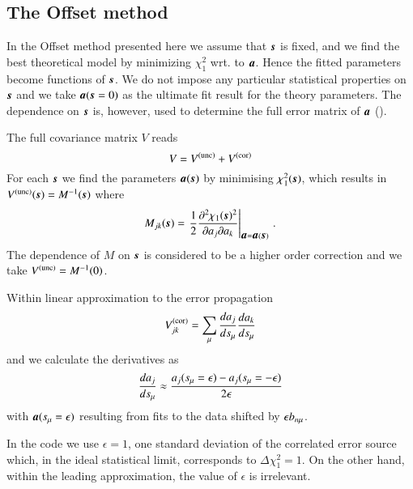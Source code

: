 \subsection{The Offset method}

In the Offset method presented here we assume that $\mb\rs$ is fixed, 
and we find the best theoretical model by minimizing
$\chi_1^2$ wrt. to $\mb a$. 
Hence the fitted parameters become functions
of $\mb\rs$. %
We do not impose any particular statistical properties on $\mb\rs$ 
and we take $\mb a(\mb\rs=0)$ as the ultimate fit result for the theory parameters. 
The dependence on $\mb\rs$ is, however, used to determine
the full error matrix of $\mb a$ (\cf \cite{Pascaud:1995qs}).

The full covariance matrix $V$ reads
\begin{equation}
\label{eq:Cv-full}
V = \Vstat + \Vsys
\end{equation}
For each $\mb\rs$ we find the parameters $\mb a(\mb \rs)$ by minimising $\chi_1^2(\mb \rs)$, which results in
$\Vstat(\mb \rs) = M^{-1}(\mb \rs)$ where
\begin{equation}
M_{jk}(\mb \rs)
= \left.
{\frac12} \frac{\partial^2\chi_1(\mb \rs)^2}{\partial a_j \partial a_k}\right\vert_{\mb a = \mb a(\mb \rs)}
\,.
\end{equation}
The dependence of $M$ on $\mb \rs$ is considered to be a higher order correction
and we take $\Vstat = M^{-1}(0)$.

Within linear approximation to the error propagation
\begin{equation}
\label{eq:Vsysp}
\Vsys_{jk} = \sum_\mu \frac{da_j}{d\rs_\mu} \frac{da_k}{d\rs_\mu}
\end{equation} 
and we calculate the derivatives as
\begin{equation}
\frac{da_j}{ds_\mu} \approx
\frac{a_j(s_\mu=\epsilon) - a_j(s_\mu=-\epsilon)}{2\epsilon}
\end{equation}
with $\mb a(\rs_\mu=\epsilon)$ resulting from
fits to the data shifted by $\epsilon b_{n\mu}$.

In the code we use $\epsilon=1$, \ie one standard deviation of
the correlated error source which, in the ideal statistical limit, corresponds to 
$\Delta\chi_1^2 = 1$.
On the other hand, within the leading approximation, the value of $\epsilon$ is irrelevant.

